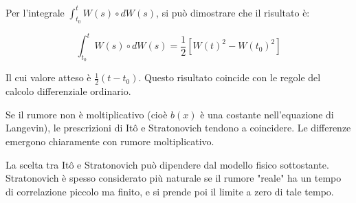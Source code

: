 Per l'integrale $\int_{t_0}^t W(s) \circ dW(s)$, si può dimostrare che il risultato è:


\begin{equation}
\int_{t_0}^t W(s) \circ dW(s) = \frac{1}{2}[W(t)^2 - W(t_0)^2]
\end{equation}


Il cui valore atteso è $\frac{1}{2}(t-t_0)$. Questo risultato coincide con le regole del calcolo differenziale ordinario.

Se il rumore non è moltiplicativo (cioè $b(x)$ è una costante nell'equazione di Langevin), le prescrizioni di Itô e Stratonovich tendono a coincidere. Le differenze emergono chiaramente con rumore moltiplicativo.

La scelta tra Itô e Stratonovich può dipendere dal modello fisico sottostante. Stratonovich è spesso considerato più naturale se il rumore "reale" ha un tempo di correlazione piccolo ma finito, e si prende poi il limite a zero di tale tempo.